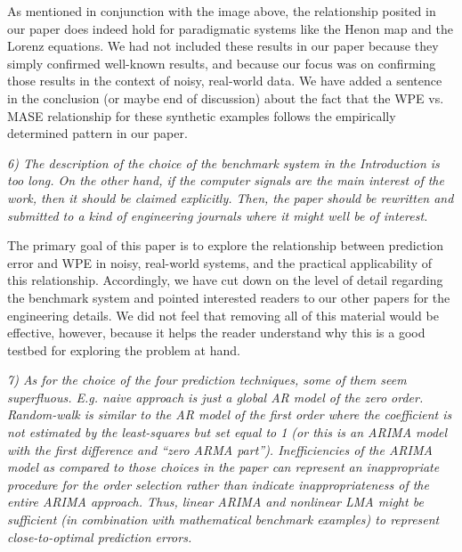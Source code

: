 \documentclass[12pt]{article}
\newcommand{\alert}[1]{{\color{red}#1}}
\begin{document}
{As mentioned in conjunction with the image above, the relationship
posited in our paper does indeed hold for paradigmatic systems like
the Henon map and the Lorenz equations.  We had not included these
results in our paper because they simply confirmed well-known results,
and because our focus was on confirming those results in the context
of noisy, real-world data.  \alert{We have added a sentence in the
  conclusion (or maybe end of discussion) about the fact that the WPE
  vs. MASE relationship for these synthetic examples follows the
  empirically determined pattern in our paper.}

\emph{6) The description of the choice of the benchmark system in the
  Introduction is too long. On the other hand, if the computer signals
  are the main interest of the work, then it should be claimed
  explicitly. Then, the paper should be rewritten and submitted to a
  kind of engineering journals where it might well be of interest.}

The primary goal of this paper is to explore the relationship between
prediction error and WPE in noisy, real-world systems, and the
practical applicability of this relationship.  Accordingly, we have
cut down on the level of detail regarding the benchmark system and
pointed interested readers to our other papers for the engineering
details.  We did not feel that removing all of this material would
be effective, however, because it helps the reader understand why
this is a good testbed for exploring the problem at hand.

\emph{7) As for the choice of the four prediction techniques, some of
  them seem superfluous. E.g. naive approach is just a global AR model
  of the zero order.  Random-walk is similar to the AR model of the
  first order where the coefficient is not estimated by the
  least-squares but set equal to 1 (or this is an ARIMA model with the
  first difference and ``zero ARMA part''). Inefficiencies of the
  ARIMA model as compared to those choices in the paper can represent
  an inappropriate procedure for the order selection rather than
  indicate inappropriateness of the entire ARIMA approach. Thus,
  linear ARIMA and nonlinear LMA might be sufficient (in combination
  with mathematical benchmark examples) to represent close-to-optimal
  prediction errors.}

}
\end{document}
